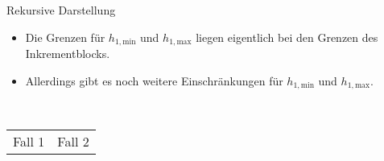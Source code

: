 \begin{frame}{Rekursive Darstellung}
\begin{itemize}
    \item Die Grenzen für $h_{1,\mathrm{min}}$ und  $h_{1, \mathrm{max}}$ liegen eigentlich bei den Grenzen des Inkrementblocks.
    \item Allerdings gibt es noch weitere Einschränkungen für $h_{1,\mathrm{min}}$ und  $h_{1, \mathrm{max}}$.
\end{itemize}
\ \\
\begin{tabular}{p{}p{}}
    Fall 1&Fall 2
\end{tabular}
\end{frame}